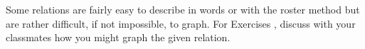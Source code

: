 {\noindent Some relations are fairly easy to describe in words or with the roster method but are rather difficult, if not impossible, to graph. For Exercises}
{, discuss with your classmates how you might graph the given relation.}
